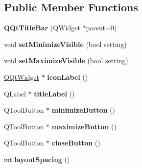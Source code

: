 \subsection*{Public Member Functions}
\begin{DoxyCompactItemize}
\item 
\mbox{\label{class_q_qt_title_bar_a448641f3f5a081ce9883264d19b9f2f9}} 
{\bfseries Q\+Qt\+Title\+Bar} (Q\+Widget $\ast$parent=0)
\item 
\mbox{\label{class_q_qt_title_bar_a42d8d5e5ef6761e1c9d19a9c64a2b040}} 
void {\bfseries set\+Minimize\+Visible} (bool setting)
\item 
\mbox{\label{class_q_qt_title_bar_a1eeae70c7aa384d9fa036b566d503593}} 
void {\bfseries set\+Maximize\+Visible} (bool setting)
\item 
\mbox{\label{class_q_qt_title_bar_a2c3a4105b21396cda8c192b4ffd1c744}} 
\mbox{\hyperlink{class_q_qt_widget}{Q\+Qt\+Widget}} $\ast$ {\bfseries icon\+Label} ()
\item 
\mbox{\label{class_q_qt_title_bar_ae7d24aaab5f820b11d561c9b75bfc49c}} 
Q\+Label $\ast$ {\bfseries title\+Label} ()
\item 
\mbox{\label{class_q_qt_title_bar_a5b03e9e0dbefb35d1bda4af2ab1f3fd2}} 
Q\+Tool\+Button $\ast$ {\bfseries minimize\+Button} ()
\item 
\mbox{\label{class_q_qt_title_bar_ad3c307cd7f69b693cdf01da64b237ee1}} 
Q\+Tool\+Button $\ast$ {\bfseries maximize\+Button} ()
\item 
\mbox{\label{class_q_qt_title_bar_a68fd38d16aeac1291c244eb9efe18acc}} 
Q\+Tool\+Button $\ast$ {\bfseries close\+Button} ()
\item 
\mbox{\label{class_q_qt_title_bar_a4d71bb1eededeb40850c531bb8ad4134}} 
int {\bfseries layout\+Spacing} ()
\item 
\mbox{\label{class_q_qt_title_bar_a5346604a27d97c37ff3eed62aaba0b0e}} 

\end{DoxyCompactItemize}
